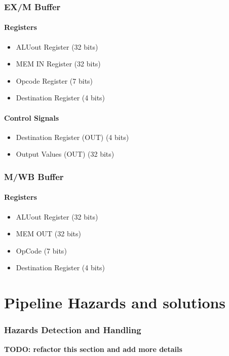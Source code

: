 \documentclass[12pt]{report}
\begin{document}
\section{EX/M Buffer}

\subsection{Registers}
\begin{itemize}
    \item ALUout Register (32 bits)
    \item MEM IN Register (32 bits)
    \item Opcode Register (7 bits)
    \item Destination Register (4 bits)
\end{itemize}

\subsection{Control Signals}
\begin{itemize}
    \item Destination Register (OUT) (4 bits)
    \item Output Values (OUT) (32 bits)
\end{itemize}

\section{M/WB Buffer}

\subsection{Registers}
\begin{itemize}
    \item ALUout Register (32 bits)
    \item MEM OUT (32 bits)
    \item OpCode (7 bits)
    \item Destination Register (4 bits)
\end{itemize}

\part{Pipeline Hazards and solutions}

\section{Hazards Detection and Handling}
\textbf{TODO: refactor this section and add more details}
\end{document}
